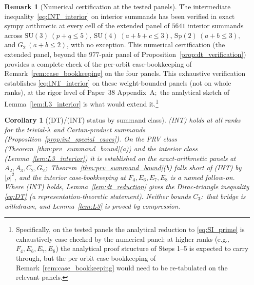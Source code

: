 \documentclass[11pt,a4paper]{article}
\theoremstyle{plain}
\newtheorem{corollary}[theorem]{Corollary}
\theoremstyle{definition}
\newtheorem{remark}[theorem]{Remark}
\newcommand{\SU}{\mathrm{SU}}
\newcommand{\Sp}{\mathrm{Sp}}
\begin{document}
\begin{remark}[Numerical certification at the tested panels]
\label{rem:numerical_certification_interior}
The intermediate inequality~\eqref{eq:INT_interior} on interior
summands has been verified in exact sympy arithmetic at every cell of
the extended panel of $5641$ interior summands across
$\SU(3)\ (p + q \le 5)$, $\SU(4)\ (a + b + c \le 3)$,
$\Sp(2)\ (a + b \le 3)$, and $G_2\ (a + b \le 2)$, with no exception.
This numerical certification (the extended panel, beyond the
$977$-pair panel of Proposition~\ref{prop:dt_verification}) provides a
complete check of the
per-orbit case-bookkeeping of Remark~\ref{rem:case_bookkeeping} on the
four panels. This exhaustive verification establishes
\eqref{eq:INT_interior} on these weight-bounded panels (not on whole
ranks), at the rigor level of Paper~38 Appendix~A;\ the analytical sketch of
Lemma~\ref{lem:L3_interior} is what would extend it.\footnote{Specifically,
on the tested panels the analytical reduction to
\eqref{eq:SI_prime} is exhaustively case-checked by the numerical
panel; at higher ranks (e.g., $F_4, E_6, E_7, E_8$) the analytical
proof structure of Steps 1--5 is expected to carry through, but the
per-orbit case-bookkeeping of Remark~\ref{rem:case_bookkeeping} would
need to be re-tabulated on the relevant panels.}
\end{remark}

\begin{corollary}[(DT)/(INT) status by summand class]
\label{cor:L3_closure_at_all_ranks}
(INT) holds at all ranks for the trivial-$\lambda$ and Cartan-product
summands (Proposition~\ref{prop:int_special_cases}). On the PRV class
(Theorem~\ref{thm:prv_summand_bound}(a)) and the interior class
(Lemma~\ref{lem:L3_interior}) it is established on the exact-arithmetic
panels at $A_2, A_3, C_2, G_2$;\ Theorem~\ref{thm:prv_summand_bound}(b)
falls short of (INT) by $|\rho|^2$, and the interior case-bookkeeping at
$F_4, E_6, E_7, E_8$ is a named follow-on. Where (INT) holds,
Lemma~\ref{lem:dt_reduction} gives the Dirac-triangle inequality
\eqref{eq:DT} (a representation-theoretic statement).  Neither bounds
$C_3$:\ that bridge is withdrawn, and Lemma~\ref{lem:L3} is proved by
compression.
\end{corollary}
\end{document}
